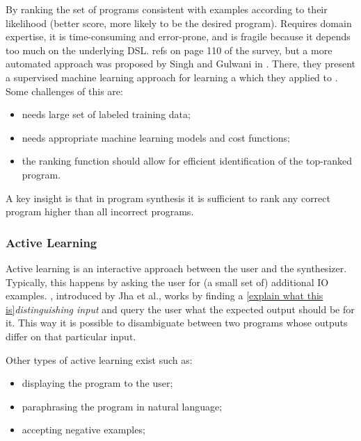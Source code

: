  By ranking the set of programs
consistent with examples according to their likelihood (better score, more
likely to be the desired program). Requires domain expertise, it is
time-consuming and error-prone, and is fragile because it depends too much on
the underlying \ac{DSL}.  {refs on page 110 of the survey},
but a more automated approach was proposed by Singh and Gulwani in
\cite{Singh:ranking:2015}. There, they present a supervised machine learning
approach for learning a  which
they applied to . Some challenges of this are:
\begin{itemize}
\item needs large set of labeled training data;
\item needs appropriate machine learning models and cost functions;
\item the ranking function should allow for efficient identification of the
  top-ranked program.
\end{itemize}

 A key insight is that in program synthesis it
is sufficient to rank any correct program higher than all incorrect programs.

\subsubsection{Active Learning}

Active learning is an interactive approach between the user and the synthesizer.
Typically, this happens by asking the user for (a small set of) additional
\ac{IO} examples. ,
introduced by Jha et al.\cite{Jha:oracle:2010}, works by finding a \ref{explain
what this is}\textit{distinguishing input} and query the user what the expected
output should be for it. This way it is possible to disambiguate between two
programs whose outputs differ on that particular input.

Other types of active learning exist such as:
\begin{itemize}
\item displaying the program to the user;
\item paraphrasing the program in natural language;
\item accepting negative examples; 
\end{itemize}



